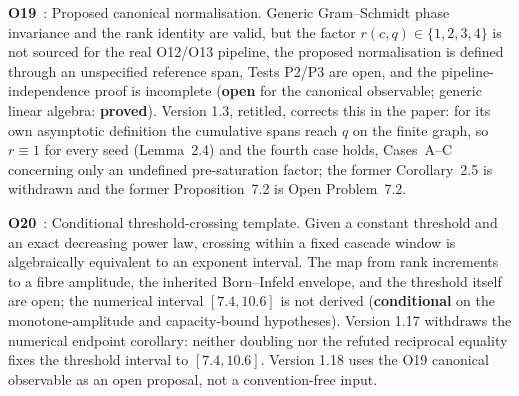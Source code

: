 \documentclass[11pt,a4paper]{article}
\newcommand{\sproved}{\textcolor{cproved}{\textbf{proved}}}
\newcommand{\sopen}{\textcolor{copen}{\textbf{open}}}
\newcommand{\scond}{\textcolor{ccond}{\textbf{conditional}}}
\begin{document}
    \textbf{O19}~\cite{Beau2026a23}: Proposed canonical normalisation.
    Generic Gram--Schmidt phase invariance and the rank identity are valid, but the factor
    $r(c,q)\in\{1,2,3,4\}$ is not sourced for the real O12/O13 pipeline, the proposed
    normalisation is defined through an unspecified reference span, Tests P2/P3 are open, and
    the pipeline-independence proof is incomplete (\sopen{} for the canonical observable; generic linear
    algebra: \sproved).
    Version 1.3, retitled, corrects this in the paper: for its own asymptotic definition the cumulative
    spans reach $q$ on the finite graph, so $r\equiv1$ for every seed (Lemma~2.4) and the fourth case
    holds, Cases~A--C concerning only an undefined pre-saturation factor; the former Corollary~2.5 is
    withdrawn and the former Proposition~7.2 is Open Problem~7.2.

    \textbf{O20}~\cite{Beau2026a24}: Conditional threshold-crossing template.
    Given a constant threshold and an exact decreasing power law, crossing within a fixed
    cascade window is algebraically equivalent to an exponent interval.  The map from rank
    increments to a fibre amplitude, the inherited Born--Infeld envelope, and the threshold
    itself are open; the numerical interval $[7.4,10.6]$ is not derived (\scond{} on the monotone-amplitude and
    capacity-bound hypotheses).
    Version 1.17 withdraws the numerical endpoint corollary: neither doubling nor the refuted reciprocal
    equality fixes the threshold interval to $[7.4,10.6]$.
    Version 1.18 uses the O19 canonical observable as an open proposal, not a convention-free input.
\end{document}
